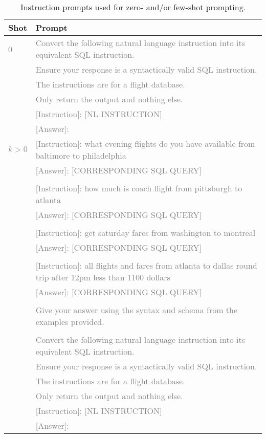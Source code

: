 \documentclass{article}
\begin{document}
\begin{table}[h!]
\centering
\begin{tabular}{p{1cm}p{12cm}}
\toprule
\textbf{Shot} & \textbf{Prompt} \\
\midrule
    \textcolor{gray}{0} & \textcolor{gray}{Convert the following natural language instruction into its equivalent SQL instruction.} \\
    & \textcolor{gray}{Ensure your response is a syntactically valid SQL instruction.} \\
    & \textcolor{gray}{The instructions are for a flight database.} \\
    & \textcolor{gray}{Only return the output and nothing else.} \\
    & \textcolor{gray}{[Instruction]: [NL INSTRUCTION]} \\
    & \textcolor{gray}{[Answer]: } \\
\midrule

\textcolor{gray}{$k > 0$} & \textcolor{gray}{[Instruction]: what evening flights do you have available from baltimore to philadelphia }\\
& \textcolor{gray}{[Answer]: [CORRESPONDING SQL QUERY]} \\
& \\
& \textcolor{gray}{[Instruction]: how much is coach flight from pittsburgh to atlanta} \\
& \textcolor{gray}{[Answer]: [CORRESPONDING SQL QUERY]} \\
& \\
& \textcolor{gray}{[Instruction]: get saturday fares from washington to montreal} \\
& \textcolor{gray}{[Answer]: [CORRESPONDING SQL QUERY]} \\
& \\
& \textcolor{gray}{[Instruction]: all flights and fares from atlanta to dallas round trip after 12pm less than 1100 dollars} \\
& \textcolor{gray}{[Answer]: [CORRESPONDING SQL QUERY]} \\
& \\
& \textcolor{gray}{Give your answer using the syntax and schema from the examples provided.} \\
& \\
& \textcolor{gray}{Convert the following natural language instruction into its equivalent SQL instruction.} \\
& \textcolor{gray}{Ensure your response is a syntactically valid SQL instruction.} \\
& \textcolor{gray}{The instructions are for a flight database.} \\
& \textcolor{gray}{Only return the output and nothing else.} \\
& \textcolor{gray}{[Instruction]: [NL INSTRUCTION]} \\
& \textcolor{gray}{[Answer]: } \\
\bottomrule
\end{tabular}
\caption{Instruction prompts used for zero- and/or few-shot prompting.}
\label{tab:icl_prompts}
\end{table}
\end{document}
